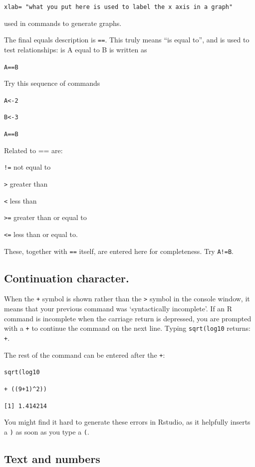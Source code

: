 \documentclass[
]{book}
\makeatletter
\newenvironment{kframe}{%
\medskip{}
\setlength{\fboxsep}{.8em}
 \def\at@end@of@kframe{}%
 \ifinner\ifhmode%
  \def\at@end@of@kframe{\end{minipage}}%
  \begin{minipage}{\columnwidth}%
 \fi\fi%
 \def\FrameCommand##1{\hskip\@totalleftmargin \hskip-\fboxsep
 \colorbox{shadecolor}{##1}\hskip-\fboxsep
     \hskip-\linewidth \hskip-\@totalleftmargin \hskip\columnwidth}%
 \MakeFramed {\advance\hsize-\width
   \@totalleftmargin\z@ \linewidth\hsize
   \@setminipage}}%
 {\par\unskip\endMakeFramed%
 \at@end@of@kframe}
\newenvironment{rmdblock}[1]
  {
  \begin{itemize}
  \renewcommand{\labelitemi}{
    \raisebox{-.7\height}[0pt][0pt]{
      {\setkeys{Gin}{width=3em,keepaspectratio}\texttt{[image: images/\#1]}}
    }
  }
  \setlength{\fboxsep}{1em}
  \begin{kframe}
  \item
  }
  {
  \end{kframe}
  \end{itemize}
  }
\newenvironment{rmdnote}
  {\begin{rmdblock}{note}}
  {\end{rmdblock}}
\makeatother
\begin{document}
\texttt{xlab=\ "what\ you\ put\ here\ is\ used\ to\ label\ the\ x\ axis\ in\ a\ graph"}

used in commands to generate graphs.

The final equals description is \texttt{==}. This truly means ``is equal to'', and is used to test relationships: is A equal to B is written as

\texttt{A==B}

Try this sequence of commands

\texttt{A\textless{}-2}

\texttt{B\textless{}-3}

\texttt{A==B}

Related to == are:

\texttt{!=} not equal to

\texttt{\textgreater{}} greater than

\texttt{\textless{}} less than

\texttt{\textgreater{}=} greater than or equal to

\texttt{\textless{}=} less than or equal to.

These, together with \texttt{==} itself, are entered here for completeness. Try \texttt{A!=B}.

\hypertarget{continuation-character.}{%
\subsection{Continuation character.}\label{continuation-character.}}

When the \texttt{+} symbol is shown rather than the \texttt{\textgreater{}} symbol in the console window, it means that your previous command was `syntactically incomplete'. If an R command is incomplete when the carriage return is depressed, you are prompted with a \texttt{+} to continue the command on the next line. Typing \texttt{sqrt(log10} returns: \texttt{+}.

The rest of the command can be entered after the \texttt{+}:

\texttt{sqrt(log10}

\texttt{+\ ((9+1)\^{}2))}

\texttt{{[}1{]}\ 1.414214}

\begin{rmdnote}
You might find it hard to generate these errors in Rstudio, as it helpfully inserts a \texttt{)} as soon as you type a \texttt{(}.
\end{rmdnote}

\hypertarget{text-and-numbers}{%
\subsection{Text and numbers}\label{text-and-numbers}}
\end{document}
